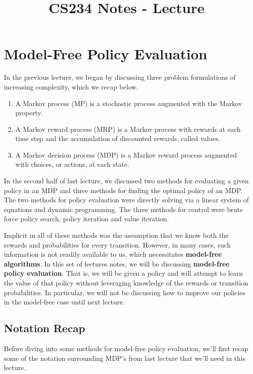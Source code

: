 \documentclass{article}
\title{CS234 Notes - Lecture \lecturenum \\ \lecturetitle }
\author{ \lecturescribe }
\begin{document}
\maketitle

\section{Model-Free Policy Evaluation}

In the previous lecture, we began by discussing three problem formulations of increasing complexity, which we recap below.
\begin{enumerate}[noitemsep,partopsep=0pt,topsep=0pt,parsep=0pt]
\item A Markov process (MP) is a stochastic process augmented with the Markov property.
\item A Markov reward process (MRP) is a Markov process with rewards at each time step and the accumulation of discounted rewards, called values.
\item A Markov decision process (MDP) is a Markov reward process augmented with choices, or actions, at each state.
\end{enumerate}

In the second half of last lecture, we discussed two methods for evaluating a given policy in an MDP and three methods for finding the optimal policy of an MDP. The two methods for policy evaluation were directly solving via a linear system of equations and dynamic programming. The three methods for control were brute force policy search, policy iteration and value iteration.

Implicit in all of these methods was the assumption that we know both the rewards and probabilities for every transition.  However, in many cases, such information is not readily available to us, which necessitates \textbf{model-free algorithms}.  In this set of lectures notes, we will be discussing \textbf{model-free policy evaluation}.  That is, we will be given a policy and will attempt to learn the value of that policy without leveraging knowledge of the rewards or transition probabilities.  In particular, we will not be discussing how to improve our policies in the model-free case until next lecture.

\subsection{Notation Recap}

Before diving into some methods for model-free policy evaluation, we'll first recap some of the notation surrounding MDP's from last lecture that we'll need in this lecture.
\end{document}
